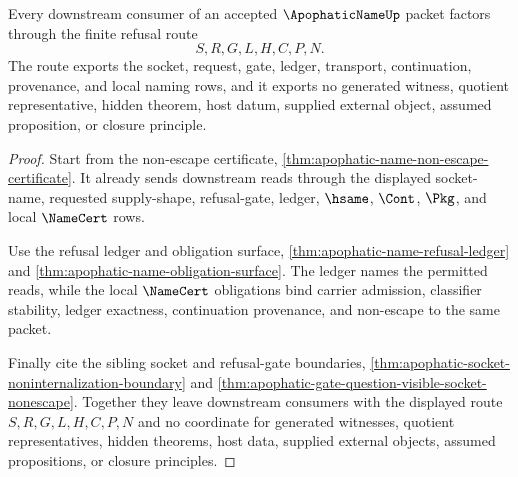 \begin{theorem}
\label{thm:apophatic-name-downstream-ledger-nonescape}
Every downstream consumer of an accepted $\ApophaticNameUp$ packet factors through the finite refusal route
$$
S,R,G,L,H,C,P,N.
$$
The route exports the socket, request, gate, ledger, transport, continuation, provenance, and local naming rows, and it exports no generated witness, quotient representative, hidden theorem, host datum, supplied external object, assumed proposition, or closure principle.
\end{theorem}
\begin{proof}
Start from the non-escape certificate, \autoref{thm:apophatic-name-non-escape-certificate}. It already sends downstream reads through the displayed socket-name, requested supply-shape, refusal-gate, ledger, $\hsame$, $\Cont$, $\Pkg$, and local $\NameCert$ rows.

Use the refusal ledger and obligation surface, \autoref{thm:apophatic-name-refusal-ledger} and \autoref{thm:apophatic-name-obligation-surface}. The ledger names the permitted reads, while the local $\NameCert$ obligations bind carrier admission, classifier stability, ledger exactness, continuation provenance, and non-escape to the same packet.

Finally cite the sibling socket and refusal-gate boundaries, \autoref{thm:apophatic-socket-noninternalization-boundary} and \autoref{thm:apophatic-gate-question-visible-socket-nonescape}. Together they leave downstream consumers with the displayed route $S,R,G,L,H,C,P,N$ and no coordinate for generated witnesses, quotient representatives, hidden theorems, host data, supplied external objects, assumed propositions, or closure principles.
\end{proof}

